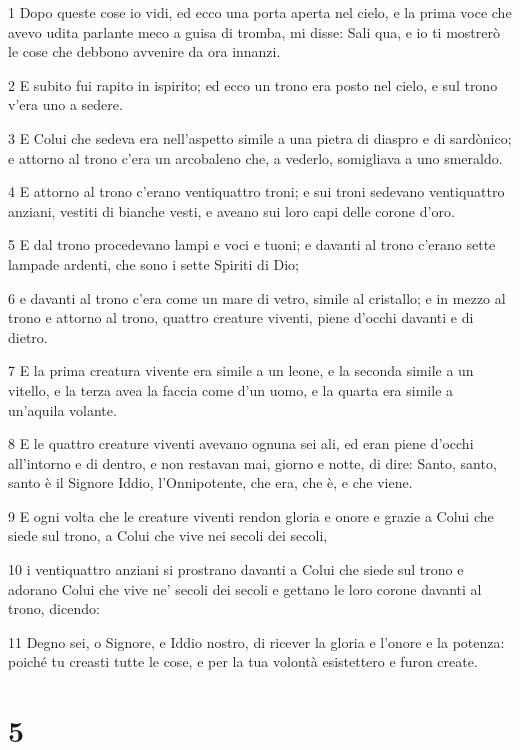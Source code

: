 \par 1 Dopo queste cose io vidi, ed ecco una porta aperta nel cielo, e la prima voce che avevo udita parlante meco a guisa di tromba, mi disse: Sali qua, e io ti mostrerò le cose che debbono avvenire da ora innanzi.
\par 2 E subito fui rapito in ispirito; ed ecco un trono era posto nel cielo, e sul trono v'era uno a sedere.
\par 3 E Colui che sedeva era nell'aspetto simile a una pietra di diaspro e di sardònico; e attorno al trono c'era un arcobaleno che, a vederlo, somigliava a uno smeraldo.
\par 4 E attorno al trono c'erano ventiquattro troni; e sui troni sedevano ventiquattro anziani, vestiti di bianche vesti, e aveano sui loro capi delle corone d'oro.
\par 5 E dal trono procedevano lampi e voci e tuoni; e davanti al trono c'erano sette lampade ardenti, che sono i sette Spiriti di Dio;
\par 6 e davanti al trono c'era come un mare di vetro, simile al cristallo; e in mezzo al trono e attorno al trono, quattro creature viventi, piene d'occhi davanti e di dietro.
\par 7 E la prima creatura vivente era simile a un leone, e la seconda simile a un vitello, e la terza avea la faccia come d'un uomo, e la quarta era simile a un'aquila volante.
\par 8 E le quattro creature viventi avevano ognuna sei ali, ed eran piene d'occhi all'intorno e di dentro, e non restavan mai, giorno e notte, di dire: Santo, santo, santo è il Signore Iddio, l'Onnipotente, che era, che è, e che viene.
\par 9 E ogni volta che le creature viventi rendon gloria e onore e grazie a Colui che siede sul trono, a Colui che vive nei secoli dei secoli,
\par 10 i ventiquattro anziani si prostrano davanti a Colui che siede sul trono e adorano Colui che vive ne' secoli dei secoli e gettano le loro corone davanti al trono, dicendo:
\par 11 Degno sei, o Signore, e Iddio nostro, di ricever la gloria e l'onore e la potenza: poiché tu creasti tutte le cose, e per la tua volontà esistettero e furon create.

\chapter{5}

